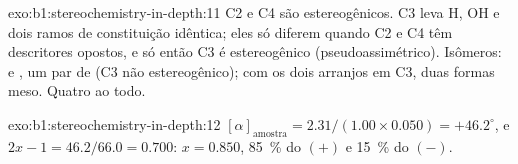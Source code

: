 \begin{solution}{exo:b1:stereochemistry-in-depth:11}
C2 e C4 são estereogênicos. C3 leva H, OH e dois ramos de constituição
idêntica; eles só diferem quando C2 e C4 têm descritores opostos, e só
então C3 é estereogênico (pseudoassimétrico). Isômeros:
 e , um par de  (C3 não estereogênico);
 com os dois arranjos em C3, duas formas meso. Quatro ao todo.
\end{solution}

\begin{solution}{exo:b1:stereochemistry-in-depth:12}
$[\alpha]_{\text{amostra}} = 2.31/(1.00 \times 0.050) = +46.2^\circ$, e
$2x - 1 = 46.2/66.0 = 0.700$: $x = 0.850$, \qty{85}{\percent} do
 $(+)$ e \qty{15}{\percent} do $(-)$.
\end{solution}

